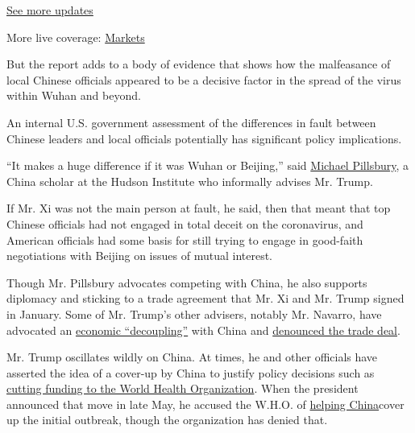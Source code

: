 \href{https://www.nytimes3xbfgragh.onion/2020/08/20/world/coronavirus-covid.html?action=click\&pgtype=Article\&state=default\&region=MAIN_CONTENT_1\&context=storylines_live_updates}{See
more updates}

More live coverage:
\href{https://www.nytimes3xbfgragh.onion/live/2020/08/20/business/stock-market-today-coronavirus?action=click\&pgtype=Article\&state=default\&region=MAIN_CONTENT_1\&context=storylines_live_updates}{Markets}

But the report adds to a body of evidence that shows how the malfeasance
of local Chinese officials appeared to be a decisive factor in the
spread of the virus within Wuhan and beyond.

An internal U.S. government assessment of the differences in fault
between Chinese leaders and local officials potentially has significant
policy implications.

``It makes a huge difference if it was Wuhan or Beijing,'' said
\href{https://www.hudson.org/experts/724-michael-pillsbury}{Michael
Pillsbury}, a China scholar at the Hudson Institute who informally
advises Mr. Trump.

If Mr. Xi was not the main person at fault, he said, then that meant
that top Chinese officials had not engaged in total deceit on the
coronavirus, and American officials had some basis for still trying to
engage in good-faith negotiations with Beijing on issues of mutual
interest.

Though Mr. Pillsbury advocates competing with China, he also supports
diplomacy and sticking to a trade agreement that Mr. Xi and Mr. Trump
signed in January. Some of Mr. Trump's other advisers, notably Mr.
Navarro, have advocated an
\href{https://www.nytimes3xbfgragh.onion/2020/06/15/business/china-decoupling.html}{economic
``decoupling''} with China and
\href{https://www.nytimes3xbfgragh.onion/2020/06/23/business/economy/trump-navarro-china-trade-deal.html}{denounced
the trade deal}.

Mr. Trump oscillates wildly on China. At times, he and other officials
have asserted the idea of a cover-up by China to justify policy
decisions such as
\href{https://www.nytimes3xbfgragh.onion/2020/05/29/us/politics/trump-hong-kong-china-WHO.html}{cutting
funding to the World Health Organization}. When the president announced
that move in late May, he accused the W.H.O. of
\href{https://www.nytimes3xbfgragh.onion/2020/05/29/health/virus-who.html}{helping
China}cover up the initial outbreak, though the organization has denied
that.


